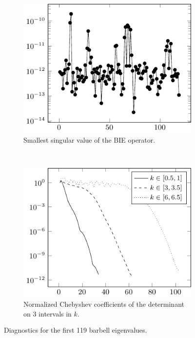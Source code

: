 \begin{figure}
  \centering
  \begin{subfigure}[t]{0.4\textwidth}
    \centering
    \includegraphics[width=\textwidth]{fig/ex_barbell_001_sings_plot}
    \caption{Smallest singular value of the BIE operator.}
    \label{subfig:barbell_sings}
  \end{subfigure}
  ~
  \begin{subfigure}[t]{0.4\textwidth}
    \centering
    \includegraphics[width=\textwidth]{fig/ex_barbell_001_coeffs_plot}
    \caption{Normalized Chebyshev coefficients of the
      determinant on 3 intervals in $k$.}
    \label{subfig:barbell_coeffs}
  \end{subfigure}
  \caption{Diagnostics for the first 119 barbell eigenvalues.}
  \label{fig:barbell_diagnostics}
\end{figure}

